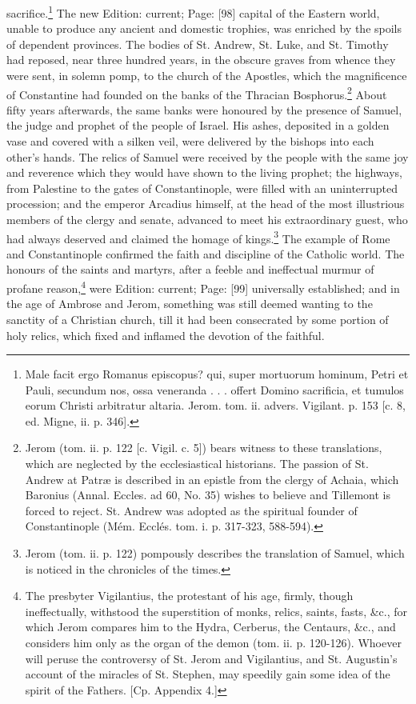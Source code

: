 sacrifice.\footnote{Male facit ergo Romanus episcopus? qui, super mortuorum hominum, Petri et Pauli, secundum nos, ossa veneranda . . . offert Domino sacrificia, et tumulos eorum Christi arbitratur altaria. Jerom. tom. ii. advers. Vigilant. p. 153 [c. 8, ed. Migne, ii. p. 346].} The new Edition: current; Page: [98] capital of the Eastern world, unable to produce any ancient and domestic trophies, was enriched by the spoils of dependent provinces. The bodies of St. Andrew, St. Luke, and St. Timothy had reposed, near three hundred years, in the obscure graves from whence they were sent, in solemn pomp, to the church of the Apostles, which the magnificence of Constantine had founded on the banks of the Thracian Bosphorus.\footnote{Jerom (tom. ii. p. 122 [c. Vigil. c. 5]) bears witness to these translations, which are neglected by the ecclesiastical historians. The passion of St. Andrew at Patræ is described in an epistle from the clergy of Achaia, which Baronius (Annal. Eccles. ad 60, No. 35) wishes to believe and Tillemont is forced to reject. St. Andrew was adopted as the spiritual founder of Constantinople (Mém. Ecclés. tom. i. p. 317-323, 588-594).} About fifty years afterwards, the same banks were honoured by the presence of Samuel, the judge and prophet of the people of Israel. His ashes, deposited in a golden vase and covered with a silken veil, were delivered by the bishops into each other\texthebrew{}’s hands. The relics of Samuel were received by the people with the same joy and reverence which they would have shown to the living prophet; the highways, from Palestine to the gates of Constantinople, were filled with an uninterrupted procession; and the emperor Arcadius himself, at the head of the most illustrious members of the clergy and senate, advanced to meet his extraordinary guest, who had always deserved and claimed the homage of kings.\footnote{Jerom (tom. ii. p. 122) pompously describes the translation of Samuel, which is noticed in the chronicles of the times.} The example of Rome and Constantinople confirmed the faith and discipline of the Catholic world. The honours of the saints and martyrs, after a feeble and ineffectual murmur of profane reason,\footnote{The presbyter Vigilantius, the protestant of his age, firmly, though ineffectually, withstood the superstition of monks, relics, saints, fasts, \&c., for which Jerom compares him to the Hydra, Cerberus, the Centaurs, \&c., and considers him only as the organ of the demon (tom. ii. p. 120-126). Whoever will peruse the controversy of St. Jerom and Vigilantius, and St. Augustin\texthebrew{}’s account of the miracles of St. Stephen, may speedily gain some idea of the spirit of the Fathers. [Cp. Appendix 4.]} were Edition: current; Page: [99] universally established; and in the age of Ambrose and Jerom, something was still deemed wanting to the sanctity of a Christian church, till it had been consecrated by some portion of holy relics, which fixed and inflamed the devotion of the faithful.


